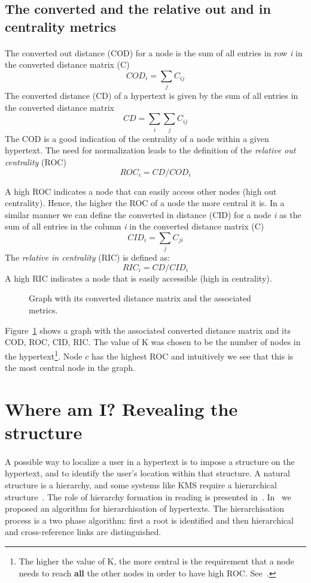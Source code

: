 \documentclass[twocolumn,10pt]{article}
\begin{document}
\subsection*{The converted and the relative out and in centrality metrics}
\paragraph{}
The converted out distance (COD) for a node is the sum of all entries
in row {\em i} in the converted distance matrix (C)
\[ COD_{i} = \sum_{j} C_{ij} \]
The converted distance (CD) of a hypertext is given by the sum of all
entries in the converted distance matrix
\[ CD = \sum_{i} \sum_{j} C_{ij} \]
The COD is a good indication of the centrality of a node within a given
hypertext. The need for normalization leads to the definition of
the {\em relative out centrality} (ROC)
\[ ROC_{i} = CD / COD_{i} \]

A high ROC indicates a node that can easily access other
nodes (high out centrality). Hence, the higher the ROC of a node 
the more central it is.
In a similar manner we can define the converted in distance (CID) for a node
{\em i} as the sum of all entries in the column {\em i} in the converted 
distance matrix (C)
\[ CID_{i} = \sum_{j} C_{ji} \]
The {\em relative in centrality} (RIC) is defined as:
\[ RIC_{i} = CD / CID_{i} \]
A high RIC indicates a node that is easily accessible (high in centrality).

\begin{figure}
\vspace*{8cm}
\caption [10pt] {Graph with its converted distance matrix and the 
associated metrics.}
\label{fig:roc}
\end{figure}

Figure~\ref{fig:roc} shows a graph with the associated converted 
distance matrix and
its COD, ROC, CID, RIC. The value of K was chosen to be the number of nodes
in the hypertext\footnote{The higher the value of K, the more central is the
requirement that a node needs to reach {\bf all} the other nodes in order to
have high ROC. See~\cite{bot90}.}.
Node $c$ has the highest ROC and intuitively we see that this is 
the most central node in the graph. 

\section{Where am I? Revealing the structure}
\paragraph{}
A possible way to localize a user in a hypertext is to impose a
structure on the hypertext, and to identify the user's location within
that structure. A natural structure is a hierarchy, and some systems
like KMS require a hierarchical structure~\cite{kms}. The role of
hierarchy formation in reading is presented in~\cite{cha87,van83}. 
In~\cite{bot90} we proposed an algorithm for hierarchisation of
hypertexts. The hierarchisation process is a two phase algorithm: first
a root is identified and then hierarchical and cross-reference links
are distinguished.
\end{document}
